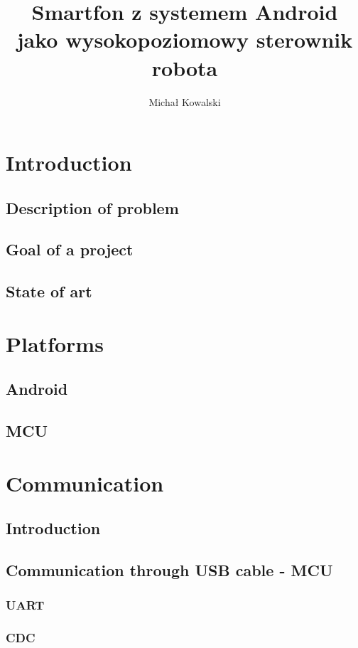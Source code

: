\documentclass[openany]{mgr} %
\author{Michał Kowalski} %
\title{Smartfon z systemem Android\\jako wysokopoziomowy sterownik robota}
\begin{document}
\maketitle
\tableofcontents

\chapter{Introduction}

\section{Description of problem}

\section{Goal of a project}

\section{State of art}

\chapter{Platforms}
\section{Android}
\section{MCU}

\chapter{Communication}

\section{Introduction}

\section{Communication through USB cable - MCU}
\subsection{UART}
\subsection{CDC}
\end{document}
